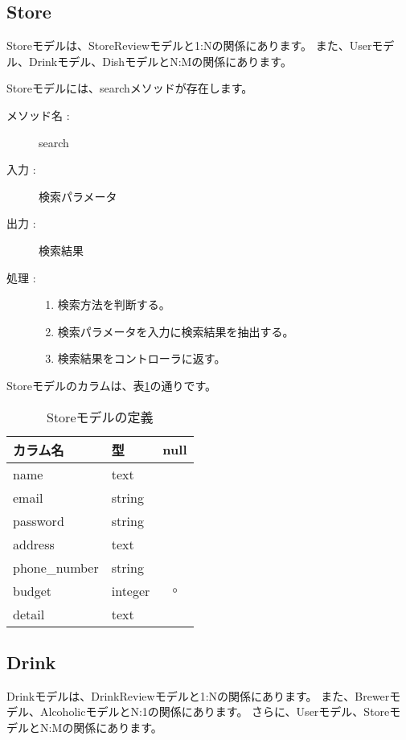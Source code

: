 \documentclass[a4j,titlepage]{jarticle}
\begin{document}
\subsection{Store}
Storeモデルは、StoreReviewモデルと1:Nの関係にあります。
また、Userモデル、Drinkモデル、DishモデルとN:Mの関係にあります。

Storeモデルには、searchメソッドが存在します。

\begin{description}
\item [メソッド名 :] search
\item [入力 :] 検索パラメータ
\item [出力 :] 検索結果
\item [処理 :]\mbox{}
  \begin{enumerate}
  \item 検索方法を判断する。
  \item 検索パラメータを入力に検索結果を抽出する。
  \item 検索結果をコントローラに返す。
  \end{enumerate}
\end{description}

Storeモデルのカラムは、表\ref{store}の通りです。

\begin{table}[!htbp]
\caption{Storeモデルの定義}
\label{store}
\small
\begin{center}
\begin{tabular}{|l|l|c|}\hline
カラム名 & 型 & null \\\hline\hline
name & text & \\\hline
email & string & \\\hline
password & string & \\\hline
address & text & \\\hline
phone\_number & string & \\\hline
budget & integer & $\circ$ \\\hline
detail & text & \\\hline
\end{tabular}
\end{center}
\end{table}

\subsection{Drink}
Drinkモデルは、DrinkReviewモデルと1:Nの関係にあります。
また、Brewerモデル、AlcoholicモデルとN:1の関係にあります。
さらに、Userモデル、StoreモデルとN:Mの関係にあります。
\end{document}
